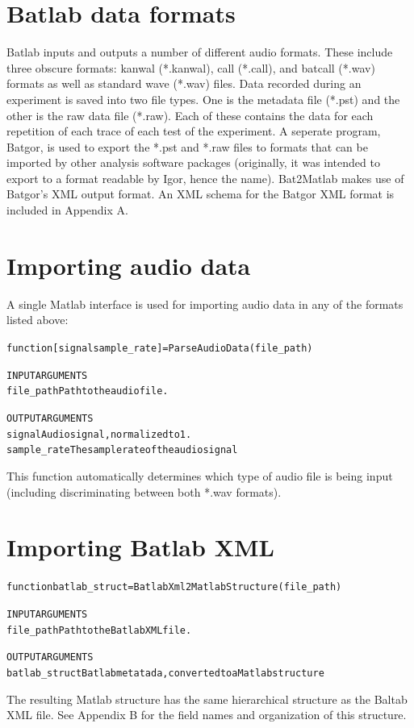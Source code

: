 \documentclass[11pt,letterpaper]{article}
\begin{document}
\section{Batlab data formats}
Batlab inputs and outputs a number of different audio formats. These
include three obscure formats: kanwal (*.kanwal), call (*.call), and
batcall (*.wav) formats as well as standard wave (*.wav) files. Data
recorded during an experiment is saved into two file types. One is
the metadata file (*.pst) and the other is the raw data file
(*.raw). Each of these contains the data for each repetition of each
trace of each test of the experiment. A seperate program,
Batgor\footnotemark, is used to export the *.pst and *.raw files to
formats that can be imported by other analysis software packages
(originally, it was intended to export to a format readable by Igor,
hence the name). Bat2Matlab makes use of Batgor's XML output format.
An XML schema for the Batgor XML format is included in Appendix A.


\section{Importing audio data}
A single Matlab interface is used for importing audio data in any of
the formats listed above:

\begin{footnotesize}
\begin{alltt}
function [signal sample_rate] = ParseAudioData(file_path)

   INPUT ARGUMENTS
   file_path       Path to the audio file.

   OUTPUT ARGUMENTS
   signal          Audio signal, normalized to 1.
   sample_rate     The sample rate of the audio signal
\end{alltt}
\end{footnotesize}
This function automatically determines which type of audio file is
being input (including discriminating between both *.wav formats).

\section{Importing Batlab XML}
\begin{footnotesize}
\begin{alltt}
function batlab_struct = BatlabXml2MatlabStructure(file_path)

   INPUT ARGUMENTS
   file_path       Path to the Batlab XML file.

   OUTPUT ARGUMENTS
   batlab_struct   Batlab metatada, converted to a Matlab structure
\end{alltt}
\end{footnotesize}
The resulting Matlab structure has the same hierarchical structure
as the Baltab XML file. See Appendix B for the field names and
organization of this structure.
\end{document}
